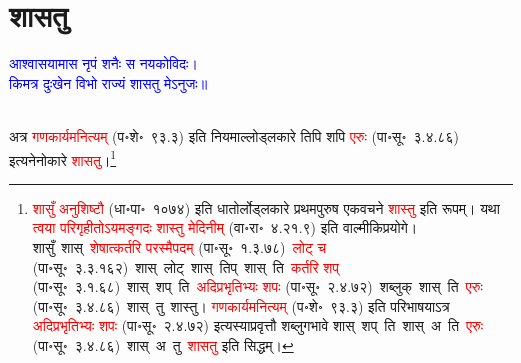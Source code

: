 \section[शासतु]{शासतु}
\centering\textcolor{blue}{आश्वासयामास नृपं शनैः स नयकोविदः।\nopagebreak\\
किमत्र दुःखेन विभो राज्यं शासतु मेऽनुजः॥}\nopagebreak\\
\\
\fontsize{14}{21}\selectfont\begin{sloppypar}\justifying\noindent\hspace{10mm} अत्र \textcolor{red}{गण\-कार्यमनित्यम्} (प॰शे॰~९३.३) इति नियमाल्लोड्लकारे तिपि शपि \textcolor{red}{एरुः} (पा॰सू॰~३.४.८६) इत्यनेनोकारे \textcolor{red}{शासतु}।\footnote{\textcolor{red}{शासुँ अनुशिष्टौ} (धा॰पा॰~१०७४) इति धातोर्लोड्लकारे प्रथमपुरुष एकवचने \textcolor{red}{शास्तु} इति रूपम्। यथा \textcolor{red}{त्वया परिगृहीतोऽयमङ्गदः शास्तु मेदिनीम्} (वा॰रा॰~४.२१.९) इति वाल्मीकिप्रयोगे। शासुँ~\arrow शास्~\arrow \textcolor{red}{शेषात्कर्तरि परस्मैपदम्} (पा॰सू॰~१.३.७८)~\arrow \textcolor{red}{लोट् च} (पा॰सू॰~३.३.१६२)~\arrow शास्~लोट्~\arrow शास्~तिप्~\arrow शास्~ति~\arrow \textcolor{red}{कर्तरि शप्‌} (पा॰सू॰~३.१.६८)~\arrow शास्~शप्~ति~\arrow \textcolor{red}{अदिप्रभृतिभ्यः शपः} (पा॰सू॰~२.४.७२)~\arrow शब्लुक्~\arrow शास्~ति~\arrow \textcolor{red}{एरुः} (पा॰सू॰~३.४.८६)~\arrow शास्~तु~\arrow शास्तु। \textcolor{red}{गण\-कार्यमनित्यम्} (प॰शे॰~९३.३) इति परिभाषयाऽत्र \textcolor{red}{अदिप्रभृतिभ्यः शपः} (पा॰सू॰~२.४.७२) इत्यस्याप्रवृत्तौ शब्लुगभावे शास्~शप्~ति~\arrow शास्~अ~ति~\arrow \textcolor{red}{एरुः} (पा॰सू॰~३.४.८६)~\arrow शास्~अ~तु~\arrow \textcolor{red}{शासतु} इति सिद्धम्।}\end{sloppypar}
